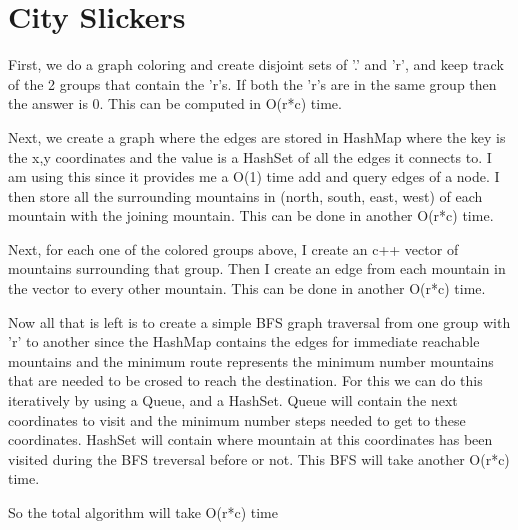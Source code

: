 \documentclass{article}
\begin{document}
\section{City Slickers}
First, we do a graph coloring and create disjoint sets of '.' and 'r', and keep track of the 2 groups that contain the 'r's. If both the 'r's are in the same group then the answer is 0. This can be computed in O(r*c) time.
\par
Next, we create a graph where the edges are stored in HashMap where the key is the x,y coordinates and the value is a HashSet of all the edges it connects to. I am using this since it provides me a O(1) time add and query edges of a node. I then store all the surrounding mountains in (north, south, east, west) of each mountain with the joining mountain. This can be done in another O(r*c) time.
\par
Next, for each one of the colored groups above, I create an c++ vector of mountains surrounding that group. Then I create an edge from each mountain in the vector to every other mountain. This can be done in another O(r*c) time.
\par
Now all that is left is to create a simple BFS graph traversal from one group with 'r' to another since the HashMap contains the edges for immediate reachable mountains and the minimum route represents the minimum number mountains that are needed to be crosed to reach the destination. For this we can do this iteratively by using a Queue, and a HashSet. Queue will contain the next coordinates to visit and the minimum number steps needed to get to these coordinates. HashSet will contain where mountain at this coordinates has been visited during the BFS treversal before or not. This BFS will take another O(r*c) time.
\par
So the total algorithm will take O(r*c) time
\end{document}
